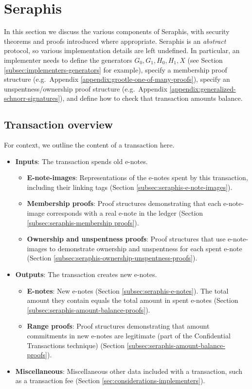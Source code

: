 \section{Seraphis}
\label{sec:seraphis}

In this section we discuss the various components of Seraphis, with security theorems and proofs introduced where appropriate. Seraphis is an {\em abstract} protocol, so various implementation details are left undefined. In particular, an implementer needs to define the generators $G_0, G_1, H_0, H_1, X$ (see Section \ref{subsec:implementers-generators} for example), specify a membership proof structure (e.g.\ Appendix \ref{appendix:grootle-one-of-many-proofs}), specify an unspentness/ownership proof structure (e.g.\ Appendix \ref{appendix:generalized-schnorr-signatures}), and define how to check that transaction amounts balance.


\subsection{Transaction overview}
\label{subsec:seraphis-transaction-overview}

For context, we outline the content of a transaction here.

\begin{itemize}
    \item \textbf{Inputs}: The transaction spends old e-notes.
    \begin{itemize}
        \item \textbf{E-note-images}: Representations of the e-notes spent by this transaction, including their linking tags (Section \ref{subsec:seraphis-e-note-images}).
        \item \textbf{Membership proofs}: Proof structures demonstrating that each e-note-image corresponds with a real e-note in the ledger (Section \ref{subsec:seraphis-membership proofs}).
        \item \textbf{Ownership and unspentness proofs}: Proof structures that use e-note-images to demonstrate ownership and unspentness for each spent e-note (Section \ref{subsec:seraphis-ownership-unspentness-proofs}).
    \end{itemize}
    \item \textbf{Outputs}: The transaction creates new e-notes.
    \begin{itemize}
        \item \textbf{E-notes}: New e-notes (Section \ref{subsec:seraphis-e-notes}). The total amount they contain equals the total amount in spent e-notes (Section \ref{subsec:seraphis-amount-balance-proofs}).
        \item \textbf{Range proofs}: Proof structures demonstrating that amount commitments in new e-notes are legitimate (part of the Confidential Transactions technique) (Section \ref{subsec:seraphis-amount-balance-proofs}).
    \end{itemize}
    \item \textbf{Miscellaneous}: Miscellaneous other data included with a transaction, such as a transaction fee (Section \ref{sec:considerations-implementers}).
\end{itemize}


